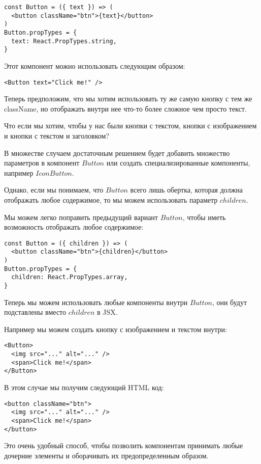 \begin{lstlisting}
const Button = ({ text }) => (
  <button className="btn">{text}</button>
)
Button.propTypes = {
  text: React.PropTypes.string,
}	
\end{lstlisting}

Этот компонент можно использовать следующим образом:

\begin{lstlisting}
<Button text="Click me!" />
\end{lstlisting}

Теперь предположим, что мы хотим использовать ту же самую кнопку с тем же className, но отображать внутри нее что-то более сложное чем просто текст.

Что если мы хотим, чтобы у нас были кнопки с текстом, кнопки с изображением и кнопки с текстом и заголовком?

В множестве случаем достаточным решением будет добавить множество параметров в компонент $Button$ или создать специализированные компоненты, например $IconButton$.

Однако, если мы понимаем, что $Button$ всего лишь обертка, которая должна отображать любое содержимое, то мы можем использовать параметр $children$.

Мы можем легко поправить предыдущий вариант $Button$, чтобы иметь возможность отображать любое содержимое:

\begin{lstlisting}
const Button = ({ children }) => (
  <button className="btn">{children}</button>
)
Button.propTypes = {
  children: React.PropTypes.array,
}
\end{lstlisting}

Теперь мы можем использовать любые компоненты внутри $Button$, они будут подставлены вместо $children$ в JSX. 

Например мы можем создать кнопку с изображением и текстом внутри:

\begin{lstlisting}
<Button>
  <img src="..." alt="..." />
  <span>Click me!</span>
</Button>
\end{lstlisting}

В этом случае мы получим следующий HTML код:

\begin{lstlisting}
<button className="btn">
  <img src="..." alt="..." />
  <span>Click me!</span>
</button>
\end{lstlisting}

Это очень удобный способ, чтобы позволить компонентам принимать любые дочерние элементы и оборачивать их предопределенным образом.


